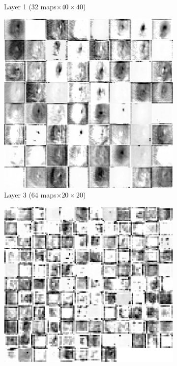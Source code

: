 \documentclass[fleqn,usenatbib]{mnras}
\begin{document}
\begin{figure}
\begin{subfigure}[c]{0.24\linewidth}
    \caption{Layer 1 (32 maps$\times40\times40$)}
  \end{subfigure}
  \hfill
  \begin{subfigure}[c]{0.24\linewidth}
  \centering
    \includegraphics[width=\textwidth]{figures/galaxy_conv21.pdf}
    \caption{Layer 3 (64 maps$\times20\times20$)}
  \end{subfigure}
  \hfill
  \begin{subfigure}[c]{0.24\linewidth}
  \centering
    \includegraphics[width=\textwidth]{figures/galaxy_conv31.pdf}

\end{subfigure}
\end{figure}
\end{document}

